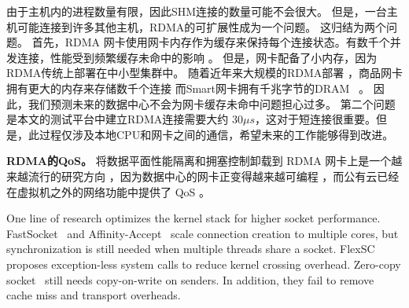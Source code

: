 由于主机内的进程数量有限，因此SHM连接的数量可能不会很大。
但是，一台主机可能连接到许多其他主机，RDMA的可扩展性成为一个问题。
这归结为两个问题。
首先，RDMA 网卡使用网卡内存作为缓存来保持每个连接状态。有数千个并发连接，性能受到频繁缓存未命中的影响 \cite {mprdma,kaminsky2016design,kalia2018datacenter}。
但是，网卡配备了小内存，因为RDMA传统上部署在中小型集群中。
随着近年来大规模的RDMA部署 \cite {guo2016rdma}，商品网卡拥有更大的内存来存储数千个连接 \cite {kalia2018datacenter}而Smart网卡拥有千兆字节的DRAM~ \cite {mellanox-innova,mellanox-bluefield,smartnic}。
因此，我们预测未来的数据中心不会为网卡缓存未命中问题担心过多。
第二个问题是本文的测试平台中建立RDMA连接需要大约 $30 \mu s$，这对于短连接很重要。但是，此过程仅涉及本地CPU和网卡之间的通信，希望未来的工作能够得到改进。


\textbf {RDMA的QoS。}
将数据平面性能隔离和拥塞控制卸载到 RDMA 网卡上是一个越来越流行的研究方向 \cite {peter2016arrakis,zhu2015congestion,lu2017memory,mprdma,mittal2018revisiting}，因为数据中心的网卡正变得越来越可编程  \cite{smartnic,cavium,kaufmann2015flexnic,mellanox-innova,mellanox-bluefield}，而公有云已经在虚拟机之外的网络功能中提供了 QoS \cite {li2016clicknp,panda2016netbricks,floem-osdi18}。




\iffalse
{}
One line of research optimizes the kernel stack for higher socket performance. FastSocket~\cite{lin2016scalable} and Affinity-Accept~\cite{pesterev2012improving} scale connection creation to multiple cores, but synchronization is still needed when multiple threads share a socket.
FlexSC~\cite{soares2010flexsc} proposes exception-less system calls to reduce kernel crossing overhead.
Zero-copy socket~\cite{thadani1995efficient,chu1996zero} still needs copy-on-write on senders.
In addition, they fail to remove cache miss and transport overheads.


